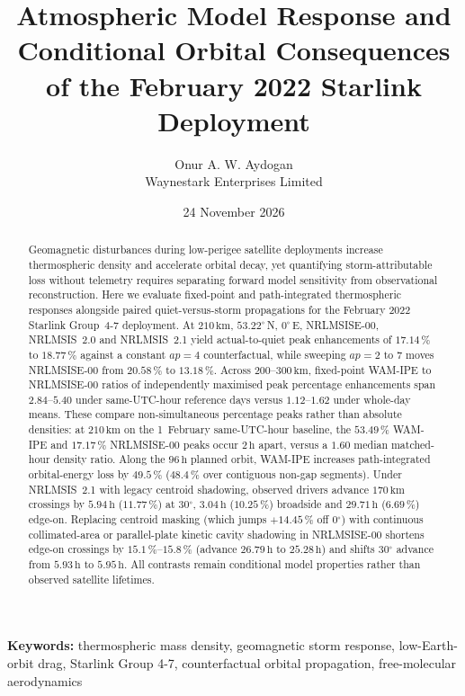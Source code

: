 \documentclass[12pt]{article}
\title{Atmospheric Model Response and Conditional Orbital Consequences of the February 2022 Starlink Deployment}
\author{Onur A. W. Aydogan\\\small Waynestark Enterprises Limited}
\date{24 November 2026}
\newcommand{\unit}[1]{\,\mathrm{#1}}
\newcommand{\degree}{\ensuremath{{}^\circ}}
\begin{document}
\maketitle

\begin{abstract}
Geomagnetic disturbances during low-perigee satellite deployments increase thermospheric density and accelerate orbital decay, yet quantifying storm-attributable loss without telemetry requires separating forward model sensitivity from observational reconstruction. Here we evaluate fixed-point and path-integrated thermospheric responses alongside paired quiet-versus-storm propagations for the February 2022 Starlink Group~4-7 deployment. At $210\unit{km}$, $53.22\degree$\,N, $0\degree$\,E, NRLMSISE-00, NRLMSIS~2.0 and NRLMSIS~2.1 yield actual-to-quiet peak enhancements of $17.14\,\%$ to $18.77\,\%$ against a constant $ap=4$ counterfactual, while sweeping $ap=2$ to $7$ moves NRLMSISE-00 from $20.58\,\%$ to $13.18\,\%$. Across $200$--$300\unit{km}$, fixed-point WAM-IPE to NRLMSISE-00 ratios of independently maximised peak percentage enhancements span $2.84$--$5.40$ under same-UTC-hour reference days versus $1.12$--$1.62$ under whole-day means. These compare non-simultaneous percentage peaks rather than absolute densities: at $210\unit{km}$ on the 1~February same-UTC-hour baseline, the $53.49\,\%$ WAM-IPE and $17.17\,\%$ NRLMSISE-00 peaks occur $2\unit{h}$ apart, versus a $1.60$ median matched-hour density ratio. Along the $96\unit{h}$ planned orbit, WAM-IPE increases path-integrated orbital-energy loss by $49.5\,\%$ ($48.4\,\%$ over contiguous non-gap segments). Under NRLMSIS~2.1 with legacy centroid shadowing, observed drivers advance $170\unit{km}$ crossings by $5.94\unit{h}$ ($11.77\,\%$) at $30\degree$, $3.04\unit{h}$ ($10.25\,\%$) broadside and $29.71\unit{h}$ ($6.69\,\%$) edge-on. Replacing centroid masking (which jumps $+14.45\,\%$ off $0\degree$) with continuous collimated-area or parallel-plate kinetic cavity shadowing in NRLMSISE-00 shortens edge-on crossings by $15.1\,\%$--$15.8\,\%$ (advance $26.79\unit{h}$ to $25.28\unit{h}$) and shifts $30\degree$ advance from $5.93\unit{h}$ to $5.95\unit{h}$. All contrasts remain conditional model properties rather than observed satellite lifetimes.
\end{abstract}

\noindent\textbf{Keywords:} thermospheric mass density, geomagnetic storm response, low-Earth-orbit drag, Starlink Group 4-7, counterfactual orbital propagation, free-molecular aerodynamics
\end{document}
